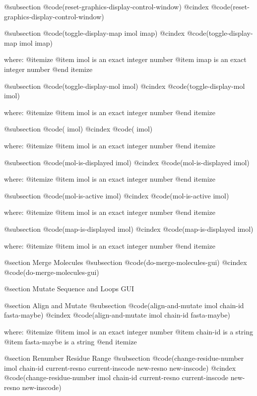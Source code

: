 @subsection @code{(reset-graphics-display-control-window)}
@cindex @code{(reset-graphics-display-control-window)}
 
@subsection @code{(toggle-display-map imol imap)}
@cindex @code{(toggle-display-map imol imap)}
 
where: 
 @itemize 
     @item imol is an exact integer number
     @item imap is an exact integer number
 @end itemize


@subsection @code{(toggle-display-mol imol)}
@cindex @code{(toggle-display-mol imol)}
 
where: 
 @itemize 
     @item imol is an exact integer number
 @end itemize


@subsection @code{( imol)}
@cindex @code{( imol)}
 
where: 
 @itemize 
     @item imol is an exact integer number
 @end itemize


@subsection @code{(mol-is-displayed imol)}
@cindex @code{(mol-is-displayed imol)}
 
where: 
 @itemize 
     @item imol is an exact integer number
 @end itemize


@subsection @code{(mol-is-active imol)}
@cindex @code{(mol-is-active imol)}
 
where: 
 @itemize 
     @item imol is an exact integer number
 @end itemize


@subsection @code{(map-is-displayed imol)}
@cindex @code{(map-is-displayed imol)}
 
where: 
 @itemize 
     @item imol is an exact integer number
 @end itemize



@section Merge Molecules 
@subsection @code{(do-merge-molecules-gui)}
@cindex @code{(do-merge-molecules-gui)}
 

@section Mutate Sequence and Loops GUI 

@section Align and Mutate 
@subsection @code{(align-and-mutate imol chain-id fasta-maybe)}
@cindex @code{(align-and-mutate imol chain-id fasta-maybe)}
 
where: 
 @itemize 
     @item imol is an exact integer number
     @item chain-id is a string
     @item fasta-maybe is a string
 @end itemize



@section Renumber Residue Range 
@subsection @code{(change-residue-number imol chain-id current-resno current-inscode new-resno new-inscode)}
@cindex @code{(change-residue-number imol chain-id current-resno current-inscode new-resno new-inscode)}
 
